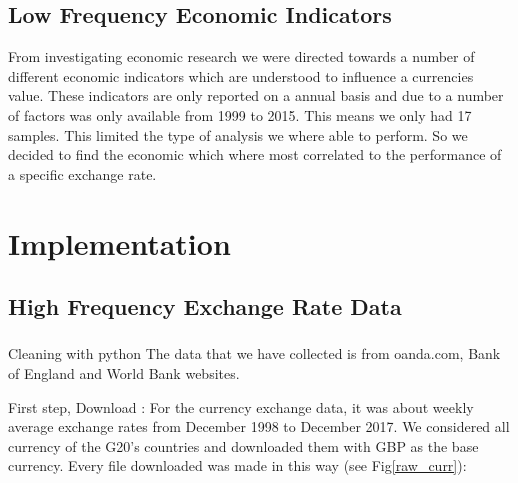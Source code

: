 \subsection{Low Frequency Economic Indicators}
From investigating economic research we were directed towards a number of different economic indicators which are understood to influence a currencies value.  These indicators are only reported on a annual basis and due to a number of factors was only available from 1999 to 2015.  This means we only had 17 samples.  This limited the type of analysis we where able to perform. So we decided to find the economic which where most correlated to the performance of a specific exchange rate. 

\section{Implementation}
\subsection{High Frequency Exchange Rate Data}
\subsubsection{}{Cleaning with python}
\newline
The data that we have collected is from oanda.com, Bank of England and World Bank websites. 
\newline

First step, Download : For the currency exchange data, it was about weekly average exchange rates from December 1998 to December 2017. We considered all currency of the G20's countries and downloaded them with GBP as the base currency\cite{abbate2018point}. Every file downloaded was made in this way (see Fig\ref{raw_curr}): 

